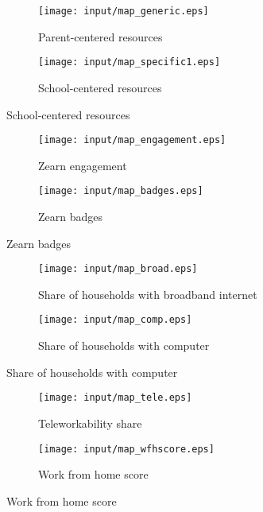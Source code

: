 \begin{figure}[hbt!]
    \centering
    \begin{subfigure}[t]{0.65\textwidth}
    \caption{Parent-centered resources}
        \centering
        \texttt{[image: input/map\_generic.eps]}
    \end{subfigure}%

    \begin{subfigure}[t]{0.65\textwidth}
    \caption{School-centered resources}
        \centering
        \texttt{[image: input/map\_specific1.eps]}
    \end{subfigure}
\end{figure}


\begin{figure}[hbt!]
    \centering
    \begin{subfigure}[t]{0.65\textwidth}
    \caption{Zearn engagement}
        \centering
        \texttt{[image: input/map\_engagement.eps]}
    \end{subfigure}%

    \begin{subfigure}[t]{0.65\textwidth}
    \caption{Zearn badges}
        \centering
        \texttt{[image: input/map\_badges.eps]}
    \end{subfigure}
\end{figure}

\begin{figure}[hbt!]
    \centering
    \begin{subfigure}[t]{0.65\textwidth}
    \caption{Share of households with broadband internet}
        \centering
        \texttt{[image: input/map\_broad.eps]}
    \end{subfigure}%

    \begin{subfigure}[t]{0.65\textwidth}
    \caption{Share of households with computer}
        \centering
        \texttt{[image: input/map\_comp.eps]}
    \end{subfigure}
\end{figure}

\begin{figure}[hbt!]
    \centering
    \begin{subfigure}[t]{0.65\textwidth}
    \caption{Teleworkability share}
        \centering
        \texttt{[image: input/map\_tele.eps]}
    \end{subfigure}%

    \begin{subfigure}[t]{0.65\textwidth}
    \caption{Work from home score}
        \centering
        \texttt{[image: input/map\_wfhscore.eps]}
    \end{subfigure}
\end{figure}

